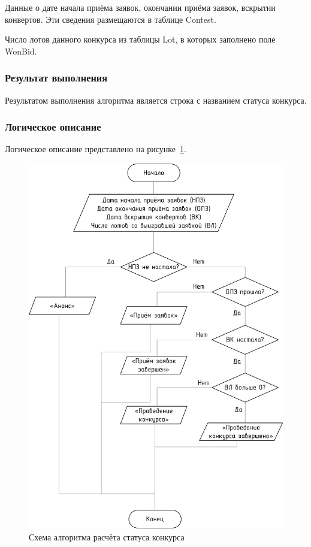 Данные о дате начала приёма заявок, окончании приёма заявок, вскрытии конвертов. Эти сведения размещаются в таблице Contest.

Число лотов данного конкурса из таблицы Lot, в которых заполнено поле WonBid.

\subsubsection*{Результат выполнения}

Результатом выполнения алгоритма является строка с названием статуса конкурса.

\subsubsection*{Логическое описание}

Логическое описание представлено на рисунке~\ref{img:algo-conteststatus}.

\begin{figure}[h!]
	\begin{center}
		\begin{minipage}[h]{\linewidth}
			\includegraphics[width=0.8\linewidth]{images/algo-conteststatus.png}
			\caption{Схема алгоритма расчёта статуса конкурса}
			\label{img:algo-conteststatus}
		\end{minipage}
		\hfill
	\end{center}
\end{figure} 

\clearpage
\newpage